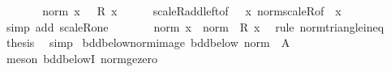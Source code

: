 \begin{isabellebody}
%
\isatagproof
{}\isamarkupfalse%
\ {\isacharminus}{\kern0pt}\isanewline
\ \ \isamarkupfalse%
\ {\isachardoublequoteopen}{}\ {\isacharequal}{\kern0pt}\ norm\ {\isacharparenleft}{\kern0pt}x\ {\isacharplus}{\kern0pt}\ {\isacharminus}{\kern0pt}{}\ {\isacharasterisk}{\kern0pt}\isactrlsub R\ x{\isacharparenright}{\kern0pt}{\isachardoublequoteclose}\isanewline
\ \ \ \ \isamarkupfalse%
\ scaleR{\isacharunderscore}{\kern0pt}add{\isacharunderscore}{\kern0pt}left{\isacharbrackleft}{\kern0pt}of\ {}\ {\isachardoublequoteopen}{\isacharminus}{\kern0pt}{}{\isachardoublequoteclose}\ x{\isacharbrackright}{\kern0pt}\ norm{\isacharunderscore}{\kern0pt}scaleR{\isacharbrackleft}{\kern0pt}of\ {}\ x{\isacharbrackright}{\kern0pt}\ \isamarkupfalse%
\ {\isacharparenleft}{\kern0pt}simp\ add{\isacharcolon}{\kern0pt}\ scaleR{\isacharunderscore}{\kern0pt}one{\isacharparenright}{\kern0pt}\isanewline
\ \ \isamarkupfalse%
\ \isamarkupfalse%
\ {\isachardoublequoteopen}{\isasymdots}\ {\isasymle}\ norm\ x\ {\isacharplus}{\kern0pt}\ norm\ {\isacharparenleft}{\kern0pt}{\isacharminus}{\kern0pt}{}\ {\isacharasterisk}{\kern0pt}\isactrlsub R\ x{\isacharparenright}{\kern0pt}{\isachardoublequoteclose}\ \isamarkupfalse%
\ {\isacharparenleft}{\kern0pt}rule\ norm{\isacharunderscore}{\kern0pt}triangle{\isacharunderscore}{\kern0pt}ineq{\isacharparenright}{\kern0pt}\isanewline
\ \ \isamarkupfalse%
\ \isamarkupfalse%
\ {\isacharquery}{\kern0pt}thesis\ \isamarkupfalse%
\ simp\isanewline
{}\isamarkupfalse%
%
\endisatagproof
{\isafoldproof}%
%
\isadelimproof
\isanewline
%
\endisadelimproof
\isanewline
{}\isamarkupfalse%
\ bdd{\isacharunderscore}{\kern0pt}below{\isacharunderscore}{\kern0pt}norm{\isacharunderscore}{\kern0pt}image{\isacharcolon}{\kern0pt}\ {\isachardoublequoteopen}bdd{\isacharunderscore}{\kern0pt}below\ {\isacharparenleft}{\kern0pt}norm\ {\isacharbackquote}{\kern0pt}\ A{\isacharparenright}{\kern0pt}{\isachardoublequoteclose}\isanewline
%
\isadelimproof
\ \ %
\endisadelimproof
%
\isatagproof
{}\isamarkupfalse%
\ {\isacharparenleft}{\kern0pt}meson\ bdd{\isacharunderscore}{\kern0pt}belowI{}\ norm{\isacharunderscore}{\kern0pt}ge{\isacharunderscore}{\kern0pt}zero{\isacharparenright}{\kern0pt}%
\endisatagproof
{\isafoldproof}%
%
\isadelimproof
\isanewline
%
\endisadelimproof
\isanewline
{}\isamarkupfalse%

\end{isabellebody}
